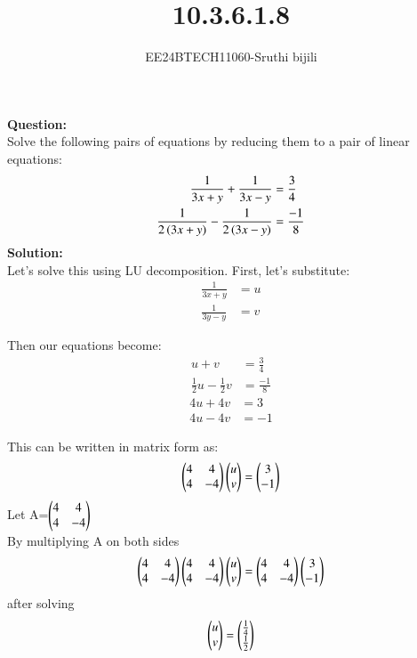 \documentclass[journal]{IEEEtran}
\begin{document}

\vspace{3cm}

\title{10.3.6.1.8}
\author{EE24BTECH11060-Sruthi bijili}
{\let\newpage\relax\maketitle}
\textbf{Question:}\\
Solve the following pairs of equations by reducing them to a pair of linear equations:
\begin{align*}
    \frac{1}{3x+y} + \frac{1}{3x-y} &= \frac{3}{4}\\
    \frac{1}{2\left(3x+y\right)} - \frac{1}{2\left(3x-y\right)} &= \frac{-1}{8}
\end{align*}
\textbf{Solution:}\\
Let's solve this using LU decomposition. First, let's substitute:
\begin{align}
    \frac{1}{3x+y} &= u\\
    \frac{1}{3y-y} &= v
\end{align}

Then our equations become:
\begin{align}
    u + v &= \frac{3}{4} \label{eq1}\\
    \frac{1}{2}u - \frac{1}{2}v &= \frac{-1}{8} \label{eq2}
\end{align}
\begin{align}
    4u + 4v &= 3 \label{eq1}\\
    4u - 4v &= -1 \label{eq2}
\end{align}


This can be written in matrix form as:
\begin{align}
    \begin{pmatrix}4 & 4 \\ 4& -4\end{pmatrix}\begin{pmatrix}u\\v\end{pmatrix} = \begin{pmatrix}3\\-1\end{pmatrix}
\end{align}
 Let A=$\begin{pmatrix}4 & 4 \\ 4& -4\end{pmatrix}$\\
By multiplying A on both sides\\
\begin{align}
    \begin{pmatrix}4 & 4 \\ 4& -4\end{pmatrix}\begin{pmatrix}4 & 4 \\ 4& -4\end{pmatrix}\begin{pmatrix}u\\v\end{pmatrix} = \begin{pmatrix}4 & 4 \\ 4& -4\end{pmatrix}\begin{pmatrix}3\\-1\end{pmatrix}
\end{align}
after solving 
\begin{align}
    \begin{pmatrix}u\\v\end{pmatrix}=\begin{pmatrix}\frac{1}{4}\\ \frac{1}{2}\end{pmatrix}
\end{align}
\end{document}
